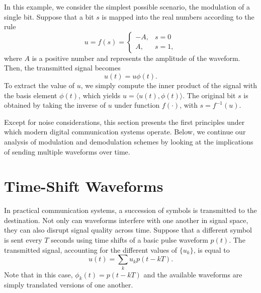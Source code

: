 \begin{example}
In this example, we consider the simplest possible scenario, the modulation of a single bit.
Suppose that a bit $s$ is mapped into the real numbers according to the rule
\begin{equation*}
u = f(s) = \begin{cases} -A, & s = 0 \\
A, & s = 1 , \end{cases}
\end{equation*}
where $A$ is a positive number and represents the amplitude of the waveform.
Then, the transmitted signal becomes
\begin{equation*}
u(t) = u \phi (t) .
\end{equation*}
To extract the value of $u$, we simply compute the inner product of the signal with the basis element $\phi(t)$, which yields $u = \langle u(t), \phi(t) \rangle$.
The original bit $s$ is obtained by taking the inverse of $u$ under function $f(\cdot)$, with $s = f^{-1} (u)$.
\end{example}

Except for noise considerations, this section presents the first principles under which modern digital communication systems operate.
Below, we continue our analysis of modulation and demodulation schemes by looking at the implications of sending multiple waveforms over time.


\section{Time-Shift Waveforms}

In practical communication systems, a succession of symbols is transmitted to the destination.
Not only can waveforms interfere with one another in signal space, they can also disrupt signal quality across time.
Suppose that a different symbol is sent every $T$ seconds using time shifts of a basic pulse waveform $p(t)$.
The transmitted signal, accounting for the different values of $\{ u_k \}$, is equal to
\begin{equation*}
u(t) = \sum_{k} u_k p (t - kT) .
\end{equation*}
Note that in this case, $\phi_k (t) = p (t - kT)$ and the available waveforms are simply translated versions of one another.

